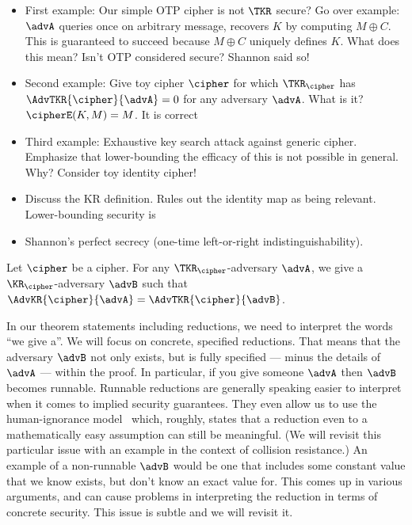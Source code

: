 \bigskip
\bigskip


\begin{itemize}
\item First example: Our simple OTP cipher is not $\TKR$ secure? Go over example: $\advA$
queries once on arbitrary message, recovers $K$ by computing $M \oplus C$. This
is guaranteed to succeed because $M \oplus C$ uniquely defines $K$. What does
this mean? Isn't OTP considered secure? Shannon said so!
%
\item Second example: Give toy cipher $\cipher$ for which $\TKR_\cipher$ has
$\AdvTKR{\cipher}{\advA} = 0$ for any adversary $\advA$. What is it?
$\cipherE(K,M) = M$. It is correct 
%
\item Third example: Exhaustive key search attack against generic
cipher. Emphasize that lower-bounding the efficacy of this is not possible in
general. Why? Consider toy identity cipher! 
%
\item Discuss the KR definition. Rules out the
identity map as being relevant. Lower-bounding security is 
%
\item Shannon's perfect secrecy (one-time left-or-right indistinguishability). 
\end{itemize}

\begin{theorem}
Let $\cipher$ be a cipher. For any $\TKR_\cipher$-adversary $\advA$, we give a
$\KR_\cipher$-adversary $\advB$ such that 
  $\AdvKR{\cipher}{\advA} = \AdvTKR{\cipher}{\advB}$.
\end{theorem}

In our theorem statements including reductions,  we need to interpret the words
``we give a''. We will focus on concrete, specified reductions. That means that
the adversary $\advB$ not only exists, but is fully specified  --- minus the
details of $\advA$ ---  within the proof.  In particular, if you give someone
$\advA$ then $\advB$ becomes runnable.  Runnable reductions are generally
speaking easier to interpret when it comes to implied security guarantees. They
even allow us to use the human-ignorance model~\cite{rogaway2006formalizing}
which, roughly, states that a reduction even to a mathematically easy assumption
can still be meaningful. (We will revisit this particular issue with an example
in the context of collision resistance.)
An example of a non-runnable $\advB$ would be one that includes some constant
value that we know exists, but don't know an exact value for. This comes up in
various arguments, and can cause problems in interpreting the reduction in terms
of concrete security.  This issue is subtle and we will revisit it.

